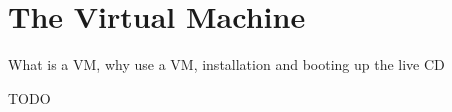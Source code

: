 \chapter{The Virtual Machine}

\begin{chapsummary}
What is a VM, why use a VM, installation and booting up the live CD
\end{chapsummary}

TODO
